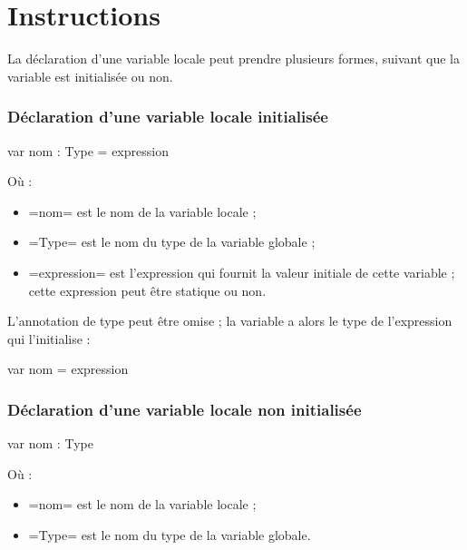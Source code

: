 




\chapter{Instructions}






La déclaration d'une variable locale peut prendre plusieurs formes, suivant que la variable est initialisée ou non.

\subsection{Déclaration d'une variable locale initialisée}

\begin{PLM}
var nom : Type = expression
\end{PLM}

Où :
\begin{itemize}
  \item \plm=nom= est le nom de la variable locale ;
  \item \plm=Type= est le nom du type de la variable globale ;
  \item \plm=expression= est l'expression qui fournit la valeur initiale de cette variable ; cette expression peut être statique ou non.
\end{itemize}

L'annotation de type peut être omise ; la variable a alors le type de l'expression qui l'initialise :
\begin{PLM}
var nom = expression
\end{PLM}


\subsection{Déclaration d'une variable locale non initialisée}
\begin{PLM}
var nom : Type
\end{PLM}
Où :
\begin{itemize}
  \item \plm=nom= est le nom de la variable locale ;
  \item \plm=Type= est le nom du type de la variable globale.
\end{itemize}

